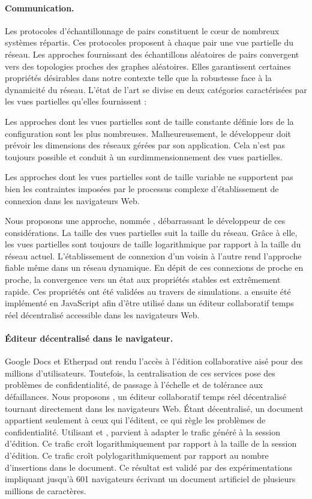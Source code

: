 \paragraph{Communication.} Les protocoles d'échantillonnage de pairs constituent
le cœur de nombreux systèmes répartis. Ces protocoles proposent à chaque pair
une vue partielle du réseau. Les approches fournissant des échantillons
aléatoires de pairs convergent vers des topologies proches des graphes
aléatoires. Elles garantissent certaines propriétés désirables dans notre
contexte telle que la robustesse face à la dynamicité du réseau.  L'état de
l'art se divise en deux catégories caractérisées par les vues partielles
qu'elles fournissent :
\begin{inparaenum}[(i)]
\item Les approches dont les vues partielles sont de taille constante définie
  lors de la configuration sont les plus nombreuses. Malheureusement, le
  développeur doit prévoir les dimensions des réseaux gérées par son
  application. Cela n'est pas toujours possible et conduit à un
  surdimmensionnement des vues partielles.
\item Les approches dont les vues partielles sont de taille variable ne
  supportent pas bien les contraintes imposées par le processus complexe
  d'établissement de connexion dans les navigateurs Web.
\end{inparaenum}
Nous proposons une approche, nommée \SPRAY, débarrassant le développeur de ces
considérations. La taille des vues partielles suit la taille du réseau. Grâce à
elle, les vues partielles sont toujours de taille logarithmique par rapport à la
taille du réseau actuel. L'établissement de connexion d'un voisin à l'autre
rend l'approche fiable même dans un réseau dynamique. En dépit de ces connexions
de proche en proche, la convergence vers un état aux propriétés stables est
extrêmement rapide. Ces propriétés ont été validées au travers de
simulations. \SPRAY a ensuite été implémenté en JavaScript afin d'être utilisé
dans un éditeur collaboratif temps réel décentralisé accessible dans les
navigateurs Web.

\paragraph{Éditeur décentralisé dans le navigateur.} Google Docs et Etherpad ont
rendu l'accès à l'édition collaborative aisé pour des millions
d'utilisateurs. Toutefois, la centralisation de ces services pose des problèmes
de confidentialité, de passage à l'échelle et de tolérance aux
défaillances. Nous proposons \CRATE, un éditeur collaboratif temps réel
décentralisé tournant directement dans les navigateurs Web. Étant décentralisé,
un document appartient seulement à ceux qui l'éditent, ce qui règle les
problèmes de confidentialité. Utilisant \SPRAY et \LSEQ, \CRATE parvient à
adapter le trafic généré à la session d'édition. Ce trafic croît
logarithmiquement par rapport à la taille de la session d'édition. Ce trafic
croît polylogarithmiquement par rapport au nombre d'insertions dans le
document. Ce résultat est validé par des expérimentations impliquant jusqu'à 601
navigateurs écrivant un document artificiel de plusieurs millions de caractères.

